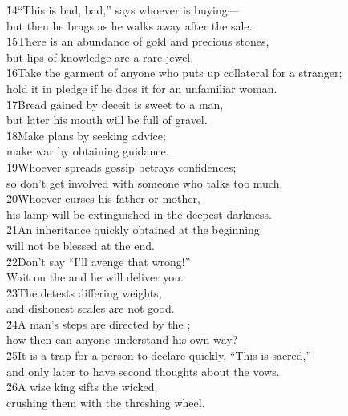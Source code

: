\begin{poetry}
\poeml \v{14}``This is bad, bad,'' says whoever is buying--- \\
\poemll    but then he brags as he walks away after the sale. \\
\poeml \v{15}There is an abundance of gold and precious stones, \\
\poemll    but lips of knowledge are a rare jewel. \\
\poeml \v{16}Take the garment of anyone who puts up collateral for a stranger; \\
\poemll    hold it in pledge if he does it for an unfamiliar woman. \\
\poeml \v{17}Bread gained by deceit is sweet to a man, \\
\poemll    but later his mouth will be full of gravel. \\
\poeml \v{18}Make plans by seeking advice; \\
\poemll    make war by obtaining guidance. \\
\poeml \v{19}Whoever spreads gossip betrays confidences; \\
\poemll    so don't get involved with someone who talks too much. \\
\poeml \v{20}Whoever curses his father or mother, \\
\poemll    his lamp will be extinguished in the deepest darkness. \\
\poeml \v{21}An inheritance quickly obtained at the beginning \\
\poemll    will not be blessed at the end. \\
\poeml \v{22}Don't say ``I'll avenge that wrong!'' \\
\poemll    Wait on the  and he will deliver you. \\
\poeml \v{23}The  detests differing weights, \\
\poemll    and dishonest scales are not good. \\
\poeml \v{24}A man's steps are directed by the ; \\
\poemll    how then can anyone understand his own way? \\
\poeml \v{25}It is a trap for a person to declare quickly, ``This is sacred,'' \\
\poemll    and only later to have second thoughts about the vows. \\
\poeml \v{26}A wise king sifts the wicked, \\
\poemll    crushing them with the threshing wheel. \\

\end{poetry}
